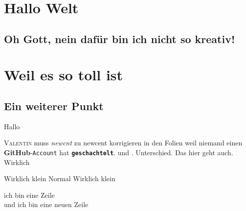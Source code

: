 \documentclass[12pt,oneside,paper=a4,ngerman]{scrartcl}
\begin{document}
    \section{Hallo Welt}
    \subsection{Oh Gott, nein dafür bin ich nicht so kreativ!}
    \blindtext[1]
    \section{Weil es so toll ist}
    \subsection{Ein weiterer Punkt}
    Hallo
    
    
    \textsc{Valentin} muss \textit{newcnt} zu newcent korrigieren in den Folien
    weil niemand einen \textbf{GitHub}-\texttt{Account} hat
    \textbf{\texttt{geschachtelt}}.  und \sffamily. Unterschied. \textsf{Das hier geht auch}. Wirklich
     
    \tiny Wirklich klein
    \normalsize Normal
    \tiny{Wirklich klein}
    
    \normalsize
    \rmfamily
    
    \begin{flushright}
    \blindtext
    \end{flushright}
    \begin{center}
    \blindtext
    \end{center}
    \begin{flushleft}
    \blindtext
    \end{flushleft}
     
    ich bin eine Zeile\\
    und ich bin eine neuen Zeile
    
\end{document}
